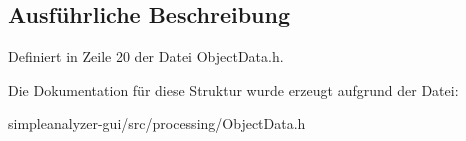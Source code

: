 \subsection{Ausführliche Beschreibung}


Definiert in Zeile 20 der Datei Object\-Data.\-h.



Die Dokumentation für diese Struktur wurde erzeugt aufgrund der Datei\-:\begin{DoxyCompactItemize}
\item 
simpleanalyzer-\/gui/src/processing/Object\-Data.\-h\end{DoxyCompactItemize}
